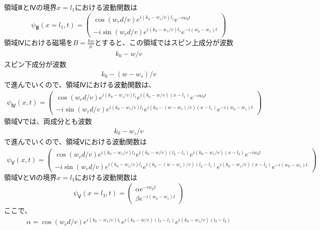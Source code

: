$領域ⅢとⅣの境界x=l_{1}における波動関数は$
\begin{align}
{\psi}_{Ⅲ}(x=l_{1},t)=
\begin{pmatrix}
\cos(w_{r}d/v)e^{i(k_{0}-w_{z}/v)l_{1}}e^{-iw_{0}t} \\
-i\sin(w_{r}d/v)e^{i(k_{0}-w_{z}/v)l_{1}}e^{-i(w_{0}-w_{s})t}
\end{pmatrix}
\end{align}
$領域Ⅳにおける磁場をB=\frac{{\hbar}w}{\mu}とすると、この領域ではスピン上成分が波数$
\begin{align}
k_{0}-w/v
\end{align}
スピン下成分が波数
\begin{align}
k_{0}-(w-w_{s})/v
\end{align}
で進んでいくので、領域Ⅳにおける波動関数は、
\begin{align}
{\psi}_{Ⅳ}(x,t)=
\begin{pmatrix}
\cos(w_{r}d/v)e^{i(k_{0}-w_{z}/v)l_{1}}e^{i(k_{0}-w/v)(x-l_{1})}e^{-iw_{0}t} \\
-i\sin(w_{r}d/v)e^{i(k_{0}-w_{z}/v)l_{1}}e^{i(k_{0}-(w-w_{s})/v)(x-l_{1})}e^{-i(w_{0}-w_{s})t}
\end{pmatrix}
\end{align}
領域Ⅴでは、両成分とも波数
\begin{align}
k_{0}-w_{z}/v
\end{align}
で進んでいくので、領域Ⅴにおける波動関数は
\begin{align}
{\psi}_{Ⅴ}(x,t)=
\begin{pmatrix}
\cos(w_{r}d/v)e^{i(k_{0}-w_{z}/v)l_{1}}e^{i(k_{0}-w/v)(l_{2}-l_{1})}e^{i(k_{0}-w_{z}/v)(x-l_{2})}e^{-iw_{0}t} \\
-i\sin(w_{r}d/v)e^{i(k_{0}-w_{z}/v)l_{1}}e^{i(k_{0}-(w-w_{s})/v)(l_{2}-l_{1})}e^{i(k_{0}-w_{z}/v)(x-l_{2})}e^{-i(w_{0}-w_{s})t}
\end{pmatrix}
\end{align}
$領域ⅤとⅥの境界x=l_{3}における波動関数は$
\begin{align}
{\psi}_{Ⅴ}(x=l_{3},t)=
\begin{pmatrix}
{\alpha}e^{-iw_{0}t} \\
{\beta}e^{-i(w_{0}-w_{s})t}
\end{pmatrix}
\end{align}
ここで、
\begin{align}
{\alpha}=\cos\left(w_{r}d/v\right)e^{i(k_{0}-w_{z}/v)l_{1}}e^{i\left(k_{0}-w/v\right)(l_{2}-l_{1})}e^{i\left(k_{0}-w_{z}/v\right)(l_{3}-l_{2})}
\end{align}
